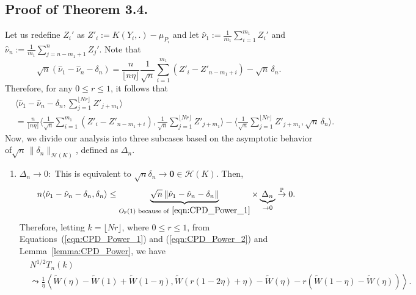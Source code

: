 \documentclass[11pt]{article}
\newcommand{\bP}{\mathbb{P}}
\theoremstyle{plain}
\theoremstyle{definition}
\theoremstyle{remark}
\begin{document}
\begin{appendix}
\subsection{Proof of Theorem 3.4.}
Let us redefine $Z_i'$ as $Z'_i:=K(Y_i,.)-\mu_{P_i}$ and let $\hat{\nu}_1:=\frac{1}{m_1}\sum_{i=1}^{m_1}Z_i'$ and $\hat{\nu}_n:=\frac{1}{m_1}\sum_{j=n-m_1+1}^{n}Z_j'$.
    Note that
    \begin{equation}\label{eqn:CPD_Power_1}
        \sqrt{n}(\hat{\nu}_1-\hat{\nu}_n-\delta_n)=\frac{n}{\lfloor n \eta \rfloor} \frac{1}{\sqrt{n}}\sum_{i=1}^{m_1}\left(Z'_i-Z'_{n-m_1+i}\right)-\sqrt{n}\,\delta_n.
    \end{equation}
    Therefore, for any $0\leq r \leq 1$, it follows that
    \begin{align}\label{eqn:CPD_Power_2}
        &\langle\hat{\nu}_1-\hat{\nu}_n-\delta_n, \sum_{j=1}^{\lfloor Nr \rfloor} Z'_{j+m_1}\rangle\\
        &=\frac{n}{\lfloor n \eta \rfloor}\langle\frac{1}{\sqrt{n}}\sum_{i=1}^{m_1}\left(Z'_i-Z'_{n-m_1+i}\right),\frac{1}{\sqrt{n}}\sum_{j=1}^{\lfloor Nr \rfloor} Z'_{j+m_1}\rangle
        -\langle\frac{1}{\sqrt{n}}\sum_{j=1}^{\lfloor Nr \rfloor} Z'_{j+m_1},\sqrt{n}\,\delta_n\rangle.
    \end{align}
    Now, we divide our analysis into three subcases based on the asymptotic behavior of\newline  $\sqrt{n}\,\|\delta_n\|_{\mathcal{H}(K)}$, defined as $\Delta_n$.
    \begin{enumerate}
        \item $\Delta_n\to 0:$ This is equivalent to $\sqrt{n}\delta_n\to \mathbf{0}\in \mathcal{H}(K).$ Then,
        \begin{align*}
            n \langle \hat{\nu}_1-\hat{\nu}_n-\delta_n, \delta_n\rangle \leq \underbrace{\sqrt{n}\left\|\hat{\nu}_1-\hat{\nu}_n-\delta_n\right\|}_{O_{\bP}(1)\text{ because of}~\ref{eqn:CPD_Power_1}}\times \underbrace{\Delta_n}_{\to 0}\overset{\bP}{\to} 0.
        \end{align*}
         Therefore, letting $k=\lfloor Nr \rfloor$, where $0\leq r \leq 1$, from Equations~(\ref{eqn:CPD_Power_1}) and (\ref{eqn:CPD_Power_2}) and Lemma~\ref{lemma:CPD_Power}, we have
        \begin{align*}
            &N^{1 / 2} T_n(k)\\
            &\leadsto \frac{1}{\eta}\left\langle \tilde{W}(\eta)-\tilde{W}(1)+\tilde{W}(1-\eta), \tilde{W}(r(1-2\eta)+\eta)-\tilde{W}(\eta)-r(\tilde{W}(1-\eta)-\tilde{W}(\eta))\right\rangle.

\end{align*}
\end{enumerate}
\end{appendix}
\end{document}
